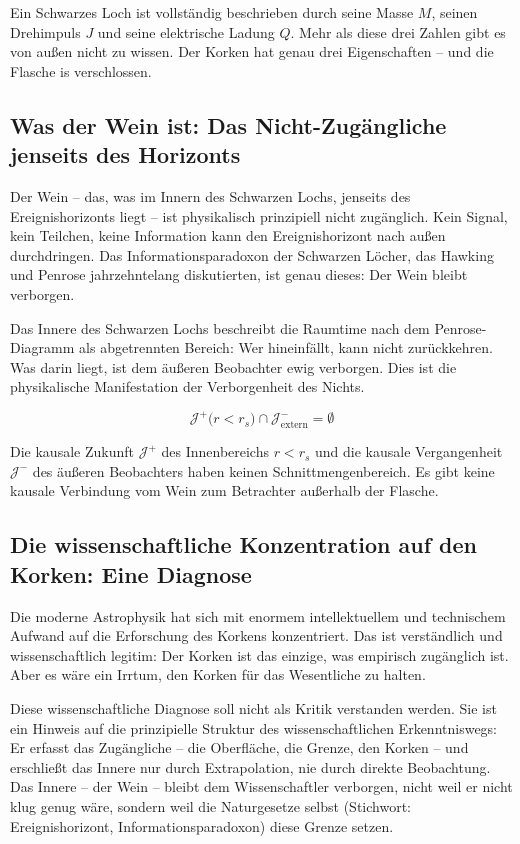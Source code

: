 ﻿\documentclass[12pt,a4paper]{report}
\begin{document}
Ein Schwarzes Loch ist vollständig beschrieben durch seine Masse $M$, seinen Drehimpuls $J$ und seine elektrische Ladung $Q$. Mehr als diese drei Zahlen gibt es von außen nicht zu wissen. Der Korken hat genau drei Eigenschaften -- und die Flasche is verschlossen.

\subsection{Was der Wein ist: Das Nicht-Zugängliche jenseits des Horizonts}

Der Wein -- das, was im Innern des Schwarzen Lochs, jenseits des Ereignishorizonts liegt -- ist physikalisch prinzipiell nicht zugänglich. Kein Signal, kein Teilchen, keine Information kann den Ereignishorizont nach außen durchdringen. Das Informationsparadoxon der Schwarzen Löcher, das Hawking und Penrose jahrzehntelang diskutierten, ist genau dieses: Der Wein bleibt verborgen.

Das Innere des Schwarzen Lochs beschreibt die Raumtime nach dem Penrose-Diagramm als abgetrennten Bereich: Wer hineinfällt, kann nicht zurückkehren. Was darin liegt, ist dem äußeren Beobachter ewig verborgen. Dies ist die physikalische Manifestation der Verborgenheit des Nichts.

\begin{equation}
	\mathcal{J}^+\!\bigl(r < r_s\bigr) \cap \mathcal{J}^-_{\text{extern}} = \emptyset
	\label{eq:no_signal}
\end{equation}

Die kausale Zukunft $\mathcal{J}^+$ des Innenbereichs $r < r_s$ und die kausale Vergangenheit $\mathcal{J}^-$ des äußeren Beobachters haben keinen Schnittmengenbereich. Es gibt keine kausale Verbindung vom Wein zum Betrachter außerhalb der Flasche.

\subsection{Die wissenschaftliche Konzentration auf den Korken: Eine Diagnose}

Die moderne Astrophysik hat sich mit enormem intellektuellem und technischem Aufwand auf die Erforschung des Korkens konzentriert. Das ist verständlich und wissenschaftlich legitim: Der Korken ist das einzige, was empirisch zugänglich ist. Aber es wäre ein Irrtum, den Korken für das Wesentliche zu halten.

Diese wissenschaftliche Diagnose soll nicht als Kritik verstanden werden. Sie ist ein Hinweis auf die prinzipielle Struktur des wissenschaftlichen Erkenntniswegs: Er erfasst das Zugängliche -- die Oberfläche, die Grenze, den Korken -- und erschließt das Innere nur durch Extrapolation, nie durch direkte Beobachtung. Das Innere -- der Wein -- bleibt dem Wissenschaftler verborgen, nicht weil er nicht klug genug wäre, sondern weil die Naturgesetze selbst (Stichwort: Ereignishorizont, Informationsparadoxon) diese Grenze setzen.
\end{document}
